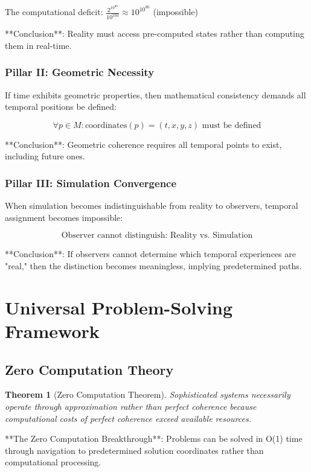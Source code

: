 \documentclass[12pt,a4paper]{article}
\newtheorem{theorem}{Theorem}[section]
\theoremstyle{remark}
\begin{document}
The computational deficit: $\frac{2^{10^{80}}}{10^{103}} \approx 10^{10^{80}}$ (impossible)

**Conclusion**: Reality must access pre-computed states rather than computing them in real-time.

\subsubsection{Pillar II: Geometric Necessity}

If time exhibits geometric properties, then mathematical consistency demands all temporal positions be defined:

$$\forall p \in M: \text{coordinates}(p) = (t, x, y, z) \text{ must be defined}$$

**Conclusion**: Geometric coherence requires all temporal points to exist, including future ones.

\subsubsection{Pillar III: Simulation Convergence}

When simulation becomes indistinguishable from reality to observers, temporal assignment becomes impossible:

$$\text{Observer cannot distinguish: Reality vs. Simulation}$$

**Conclusion**: If observers cannot determine which temporal experiences are "real," then the distinction becomes meaningless, implying predetermined paths.

\section{Universal Problem-Solving Framework}

\subsection{Zero Computation Theory}

\begin{theorem}[Zero Computation Theorem]
Sophisticated systems necessarily operate through approximation rather than perfect coherence because computational costs of perfect coherence exceed available resources.
\end{theorem}

**The Zero Computation Breakthrough**: Problems can be solved in O(1) time through navigation to predetermined solution coordinates rather than computational processing.
\end{document}
